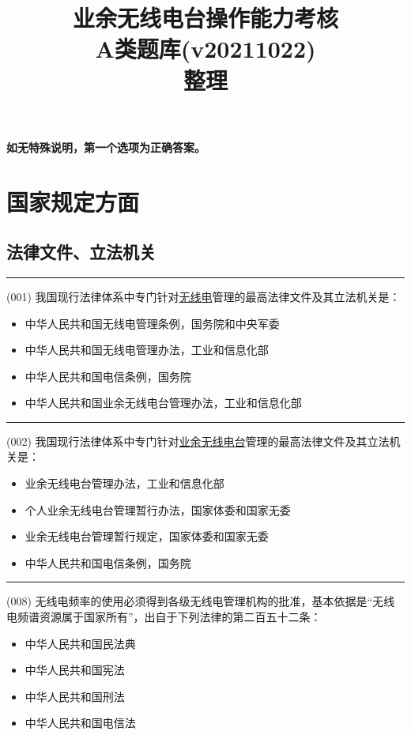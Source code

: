 \documentclass[twocolumn,hyperref,UTF8]{ctexart}  %
\title{业余无线电台操作能力考核\\A类题库(v20211022)\\整理}
\begin{document}
\maketitle

\textbf{如无特殊说明，第一个选项为正确答案。}





\section{国家规定方面}





\subsection{法律文件、立法机关}


\noindent\rule{0.5\textwidth}{1pt}
\heiti (001) 我国现行法律体系中专门针对\underline{无线电}管理的最高法律文件及其{\color{cyan}立法}机关是： \songti {\color{gray} [LK0001] }
\begin{itemize}
	\item  中华人民共和国无线电管理条例，{\color{LimeGreen}国务院和中央军委}
	\item  中华人民共和国无线电管理办法，工业和信息化部
	\item  中华人民共和国电信条例，国务院
	\item  中华人民共和国业余无线电台管理办法，工业和信息化部
\end{itemize}


\noindent\rule{0.5\textwidth}{1pt}
\heiti (002) 我国现行法律体系中专门针对\underline{业余无线电台}管理的最高法律文件及其{\color{cyan}立法}机关是： \songti {\color{gray} [LK0002] }
\begin{itemize}
	\item  业余无线电台管理办法，{\color{LimeGreen}工业和信息化部}
	\item  个人业余无线电台管理暂行办法，国家体委和国家无委
	\item  业余无线电台管理暂行规定，国家体委和国家无委
	\item  中华人民共和国电信条例，国务院
\end{itemize}


\noindent\rule{0.5\textwidth}{1pt}
\heiti (008) 无线电频率的使用必须得到各级无线电管理机构的批准，基本依据是“无线电频谱资源{\color{cyan}属于国家所有}”，出自于下列法律的第二百五十二条：  \songti {\color{gray} [LK0104] }
\begin{itemize}
	\item  中华人民共和国{\color{LimeGreen}民法典}
	\item  中华人民共和国宪法
	\item  中华人民共和国刑法
	\item  中华人民共和国电信法
\end{itemize}
\end{document}
